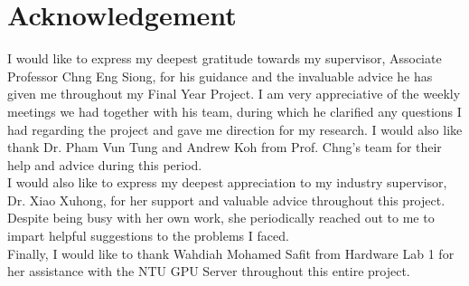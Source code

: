 
\chapter*{Acknowledgement}

I would like to express my deepest gratitude towards my supervisor, Associate Professor Chng Eng Siong, for his guidance and the invaluable advice he has given me throughout my Final Year Project. I am very appreciative of the weekly meetings we had together with his team, during which he clarified any questions I had regarding the project and gave me direction for my research. I would also like thank Dr. Pham Vun Tung and Andrew Koh from Prof. Chng's team for their help and advice during this period.\\

I would also like to express my deepest appreciation to my industry supervisor, Dr. Xiao Xuhong, for her support and valuable advice throughout this project. Despite being busy with her own work, she periodically reached out to me to impart helpful suggestions to the problems I faced.\\

Finally, I would like to thank Wahdiah Mohamed Safit from Hardware Lab 1 for her assistance with the NTU GPU Server throughout this entire project. 


